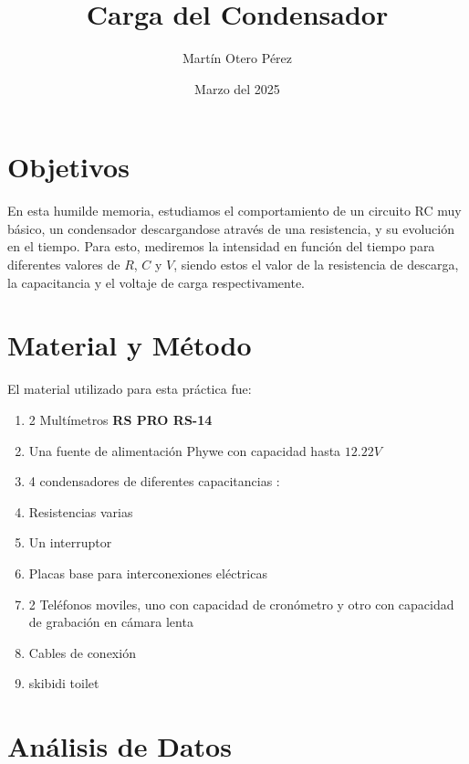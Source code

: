 \documentclass[12pt, letterpaper]{article} %
\theoremstyle{plain} %
\begin{document}

\title{\Huge{Carga del Condensador}}
\author{Martín Otero Pérez}
\date{Marzo del 2025} %
\maketitle

\renewcommand{\contentsname}{Contenido}
\newpage
\tableofcontents %
\newpage

\section*{Objetivos}

En esta humilde memoria, estudiamos el comportamiento de un circuito RC muy básico, un condensador descargandose através de una resistencia, y su evolución en el tiempo. Para esto, mediremos la intensidad en función del tiempo para diferentes valores de $R$, $C$ y $V$, siendo estos el valor de la resistencia de descarga, la capacitancia y el voltaje de carga respectivamente.

\section*{Material y Método}

El material utilizado para esta práctica fue:

\begin{enumerate}
	\item 2 Multímetros \textbf{RS PRO RS-14}
	\item Una fuente de alimentación Phywe con capacidad hasta $12.22V$
	\item 4 condensadores de diferentes capacitancias : 
	\item Resistencias varias
	\item Un interruptor
	\item Placas base para interconexiones eléctricas
	\item 2 Teléfonos moviles, uno con capacidad de cronómetro y otro con capacidad de grabación en cámara lenta
	\item Cables de conexión
	\item skibidi toilet
\end{enumerate}

\section*{Análisis de Datos}
\end{document}
